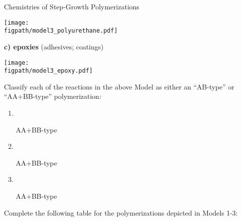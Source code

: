 \begin{activity}{Chemistries of Step-Growth Polymerizations}
\begin{model}
			\centerline{\texttt{[image: \\figpath/model3\_polyurethane.pdf]}}

\vspace{0.1in}

\textbf{c) epoxies} (adhesives; coatings)
		
			\centerline{\texttt{[image: \\figpath/model3\_epoxy.pdf]}}

\end{model}

\vspace{0.25in}
\begin{ctqs}

		\question Classify each of the reactions in the above Model as either an ``AB-type'' or ``AA+BB-type'' polymerization:
		
			\begin{enumerate}
				\item ~ \begin{solution}[0.6in]AA+BB-type\end{solution}
				\item ~ \begin{solution}[0.6in]AA+BB-type\end{solution}
				\item ~ \begin{solution}[0.6in]AA+BB-type\end{solution}
			\end{enumerate}
			
		
		\clearpage
		\question Complete the following table for the polymerizations depicted in Models 1-3:
		

\end{ctqs}
\end{activity}
